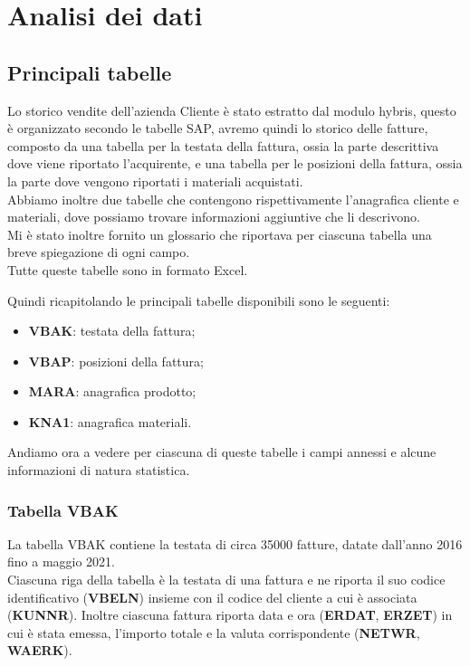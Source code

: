 
\hypertarget{(chap:capitolo2)}{}
\chapter{Analisi dei dati}
\section{Principali tabelle}
Lo storico vendite dell'azienda Cliente è stato estratto dal modulo hybris, questo è organizzato secondo le tabelle SAP, avremo quindi lo storico delle fatture, composto da una tabella per la testata della fattura, ossia la parte descrittiva dove viene riportato l'acquirente, e una tabella per le posizioni della fattura, ossia la parte dove vengono riportati i materiali acquistati.\\
Abbiamo inoltre due tabelle che contengono rispettivamente l'anagrafica cliente e materiali, dove possiamo trovare informazioni aggiuntive che li descrivono.\\
Mi è stato inoltre fornito un glossario che riportava per ciascuna tabella una breve spiegazione di ogni campo.\\
Tutte queste tabelle sono in formato Excel.

Quindi ricapitolando le principali tabelle disponibili sono le seguenti:
\begin{itemize}
	\item \textbf{VBAK}: testata della fattura;
	\item \textbf{VBAP}: posizioni della fattura;
	\item \textbf{MARA}: anagrafica prodotto;
	\item \textbf{KNA1}: anagrafica materiali.
\end{itemize}

Andiamo ora a vedere per ciascuna di queste tabelle i campi annessi e alcune informazioni di natura statistica.
\subsection{Tabella VBAK}
La tabella VBAK contiene la testata di circa 35000 fatture, datate dall'anno 2016 fino a maggio 2021.\\
Ciascuna riga della tabella è la testata di una fattura e ne riporta il suo codice identificativo (\textbf{VBELN}) insieme con il codice del cliente a cui è associata (\textbf{KUNNR}). Inoltre ciascuna fattura riporta data e ora (\textbf{ERDAT}, \textbf{ERZET}) in cui è stata emessa, l'importo totale e la valuta corrispondente (\textbf{NETWR}, \textbf{WAERK}).

